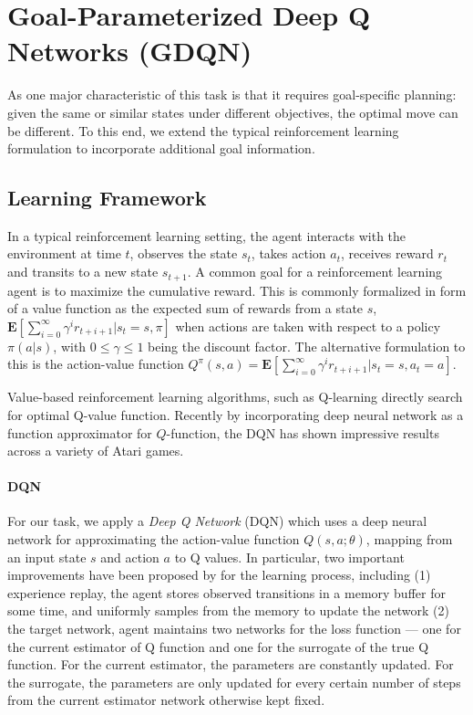 \section{Goal-Parameterized Deep Q Networks (GDQN)}
As one major characteristic of this task is that it requires goal-specific planning: given the same or similar states under different objectives, the optimal move can be different. To this end, we extend the typical reinforcement learning formulation to incorporate additional goal information.  

\subsection{Learning Framework}
In a typical reinforcement learning setting, the agent interacts with the environment at time $t$, observes the state $s_t$, takes action $a_t$, receives reward $r_t$ and transits to a new state $s_{t+1}$. A common goal for a reinforcement learning agent is to maximize the cumulative reward. This is commonly formalized in form of a value function as the expected sum of rewards from a state $s$, $\mathbf{E}[\sum\limits_{i=0}^\infty \gamma^i r_{t+i+1}|s_t = s,\pi]$ when actions are taken with respect to a policy $\pi(a|s)$, with $0\leq\gamma\leq 1$ being the discount factor. The alternative formulation to this is the action-value function $Q^\pi(s,a)=\mathbf{E}[\sum\limits_{i=0}^\infty \gamma^i r_{t+i+1}|s_t=s,a_t=a]$. 

Value-based reinforcement learning algorithms, such as Q-learning \citep{watkins1992q} directly search for optimal Q-value function. Recently by incorporating deep neural network as a function approximator for $Q$-function, the DQN \citep{mnih2015human} has shown impressive results across a variety of Atari games.

\paragraph{DQN}
For our task, we apply a {\em Deep Q Network\/} (DQN) which uses a deep neural network for approximating the action-value function $Q(s,a;\theta)$, mapping from an input state $s$ and action $a$ to Q values. In particular, two important improvements have been proposed by \cite{mnih2015human} for the learning process, including (1) experience replay, the agent stores observed transitions in a memory buffer for some time, and uniformly samples from the memory to update the network (2) the target network, agent maintains two networks for the loss function --- one for the current estimator of Q function and one for the surrogate of the true Q function. For the current estimator, the parameters are constantly updated. For the surrogate, the parameters are only updated for every certain number of steps from the current estimator network otherwise kept fixed.  

